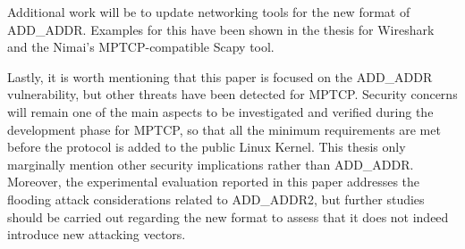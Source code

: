 Additional work will be to update networking tools for the new format of ADD\_ADDR. Examples for this have been shown in the thesis for Wireshark and the Nimai's MPTCP-compatible Scapy tool.

Lastly, it is worth mentioning that this paper is focused on the ADD\_ADDR vulnerability, but other threats have been detected for MPTCP. Security concerns will remain one of the main aspects to be investigated and verified during the development phase for MPTCP, so that all the minimum requirements are met before the protocol is added to the public Linux Kernel. This thesis only marginally mention other security implications rather than ADD\_ADDR. Moreover, the experimental evaluation reported in this paper addresses the flooding attack considerations related to ADD\_ADDR2, but further studies should be carried out regarding the new format to assess that it does not indeed introduce new attacking vectors.